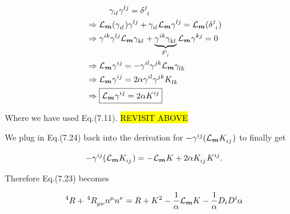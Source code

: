 \documentclass[12pt]{article}
\renewcommand{\vec}[1]{\bm{#1}}
\numberwithin{equation}{section}
\numberwithin{theorem}{subsection}
\begin{document}
\begin{align}

    & \; \; \; \; \; \; \; \; \; \;  \tensor{\gamma}{_i_l}\tensor{\gamma}{^l^j} = \tensor{\delta}{^j_i} \notag \\

    &\Rightarrow \mathcal{L}_{\vec{m}}(\tensor{\gamma}{_i_l})\tensor{\gamma}{^l^j} +\tensor{\gamma}{_i_l} \mathcal{L}_{\vec{m}}\tensor{\gamma}{^l^j} = \mathcal{L}_{\vec{m}}(\tensor{\delta}{^j_i}) \notag \\

    &\Rightarrow \tensor{\gamma}{^i^k}\tensor{\gamma}{^l^j}\mathcal{L}_{\vec{m}}\tensor{\gamma}{_k_l} + \underbrace{\tensor{\gamma}{^i^k}\tensor{\gamma}{_k_l}}_{\tensor{\delta}{^i_l}}\mathcal{L}_{\vec{m}}\tensor{\gamma}{^k^j} = 0 \notag \\

    &\Rightarrow \mathcal{L}_{\vec{m}}\tensor{\gamma}{^i^j} = -\tensor{\gamma}{^i^l}\tensor{\gamma}{^j^k}\mathcal{L}_{\vec{m}}\tensor{\gamma}{_l_k} \notag \\

    &\Rightarrow \mathcal{L}_{\vec{m}} \tensor{\gamma}{^i^j} = 2\alpha\tensor{\gamma}{^i^l}\tensor{\gamma}{^j^k}\tensor{K}{_l_k} \notag \\

    &\Rightarrow \boxed{\mathcal{L}_{\vec{m}}\tensor{\gamma}{^i^j} = 2\alpha\tensor{K}{^i^j}}

\end{align}

Where we have used Eq.(7.11). \hl{REVISIT ABOVE}

We plug in Eq.(7.24) back into the derivation for $-\tensor{\gamma}{^i^j}(\mathcal{L}_{\vec{m}}\tensor{K}{_i_j})$ to finally get

\begin{equation}

    -\tensor{\gamma}{^i^j}(\mathcal{L}_{\vec{m}}\tensor{K}{_i_j}) = -\mathcal{L}_{\vec{m}}K + 2\alpha\tensor{K}{_i_j}\tensor{K}{^i^j}.

\end{equation}

Therefore Eq.(7.23) becomes

\begin{equation}

   ^{4}R +\,^{4}\tensor{R}{_\mu_\nu}n^{\mu}n^{\nu} = R + K^{2} - \frac{1}{\alpha}\mathcal{L}_{\vec{m}}K -\frac{1}{\alpha}D_{i}D^{i}\alpha

\end{equation}
\end{document}
